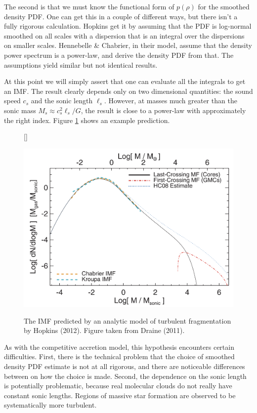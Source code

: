 \documentclass[a4paper,10pt]{article}
\begin{document}
{\noindent}The second is that we must know the functional form of $p(\rho)$ for the smoothed density PDF. One can get this in a couple of different ways, but there isn't a fully rigorous calculation. Hopkins get it by assuming that the PDF is log-normal smoothed on all scales with a dispersion that is an integral over the dispersions on smaller scales. Hennebelle \& Chabrier, in their model, assume that the density power spectrum is a power-law, and derive the density PDF from that. The assumptions yield similar but not identical results. 

{\noindent}At this point we will simply assert that one can evaluate all the integrals to get an IMF. The result clearly depends only on two dimensional quantities: the sound speed $c_s$ and the sonic length $\ell_s$. However, at masses much greater than the sonic mass $M_s \approx c_s^2\ell_s/G$, the result is close to a power-law with approximately the right index. Figure \ref{fig:imfmodel} shows an example prediction.

\begin{figure}[t]
    [\FBwidth]
    {\caption{\footnotesize{The IMF predicted by an analytic model of turbulent fragmentation by Hopkins (2012). Figure taken from Draine (2011).}}
    \label{fig:imfmodel}}
    {\includegraphics[width=12cm]{figures/IMFmodel.png}}
\end{figure}

{\noindent}As with the competitive accretion model, this hypothesis encounters certain difficulties. First, there is the technical problem that the choice of smoothed density PDF estimate is not at all rigorous, and there are noticeable differences between on how the choice is made. Second, the dependence on the sonic length is potentially problematic, because real molecular clouds do not really have constant sonic lengths. Regions of massive star formation are observed to be systematically more turbulent.
\end{document}
